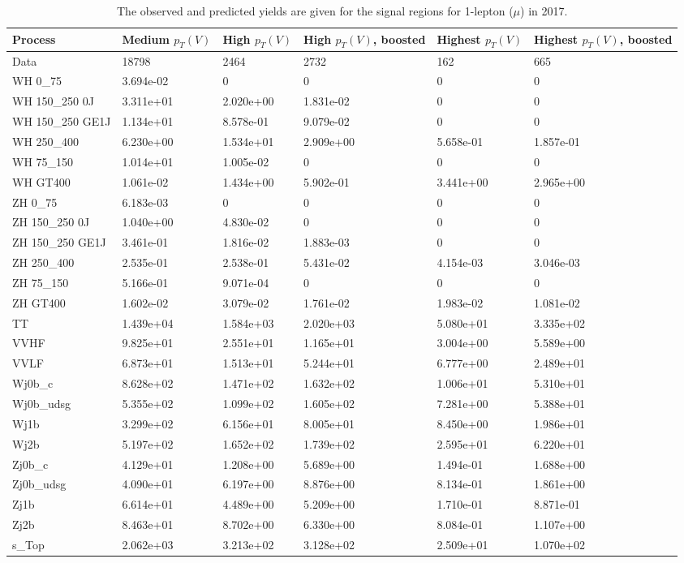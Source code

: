 \begin{table}
\centering
\caption[2017 1-lepton ($\mu$) signal selection yields]{
                  The observed and predicted yields are given for the
                  signal regions for 1-lepton ($\mu$) in 2017.
                  }
{\footnotesize
\begin{tabularx}{\textwidth}{|X|X|X|X|X|X|}
\hline
Process & Medium $p_{T}(V)$ & High $p_{T}(V)$ & High $p_{T}(V)$, boosted & Highest $p_{T}(V)$ & Highest $p_{T}(V)$, boosted \\
\hline
Data & 18798 & 2464 & 2732 & 162 & 665 \\
\hline
WH 0\_75 & 3.694e-02 & 0 & 0 & 0 & 0 \\
WH 150\_250 0J & 3.311e+01 & 2.020e+00 & 1.831e-02 & 0 & 0 \\
WH 150\_250 GE1J & 1.134e+01 & 8.578e-01 & 9.079e-02 & 0 & 0 \\
WH 250\_400 & 6.230e+00 & 1.534e+01 & 2.909e+00 & 5.658e-01 & 1.857e-01 \\
WH 75\_150 & 1.014e+01 & 1.005e-02 & 0 & 0 & 0 \\
WH GT400 & 1.061e-02 & 1.434e+00 & 5.902e-01 & 3.441e+00 & 2.965e+00 \\
ZH 0\_75 & 6.183e-03 & 0 & 0 & 0 & 0 \\
ZH 150\_250 0J & 1.040e+00 & 4.830e-02 & 0 & 0 & 0 \\
ZH 150\_250 GE1J & 3.461e-01 & 1.816e-02 & 1.883e-03 & 0 & 0 \\
ZH 250\_400 & 2.535e-01 & 2.538e-01 & 5.431e-02 & 4.154e-03 & 3.046e-03 \\
ZH 75\_150 & 5.166e-01 & 9.071e-04 & 0 & 0 & 0 \\
ZH GT400 & 1.602e-02 & 3.079e-02 & 1.761e-02 & 1.983e-02 & 1.081e-02 \\
\hline
TT & 1.439e+04 & 1.584e+03 & 2.020e+03 & 5.080e+01 & 3.335e+02 \\
VVHF & 9.825e+01 & 2.551e+01 & 1.165e+01 & 3.004e+00 & 5.589e+00 \\
VVLF & 6.873e+01 & 1.513e+01 & 5.244e+01 & 6.777e+00 & 2.489e+01 \\
Wj0b\_c & 8.628e+02 & 1.471e+02 & 1.632e+02 & 1.006e+01 & 5.310e+01 \\
Wj0b\_udsg & 5.355e+02 & 1.099e+02 & 1.605e+02 & 7.281e+00 & 5.388e+01 \\
Wj1b & 3.299e+02 & 6.156e+01 & 8.005e+01 & 8.450e+00 & 1.986e+01 \\
Wj2b & 5.197e+02 & 1.652e+02 & 1.739e+02 & 2.595e+01 & 6.220e+01 \\
Zj0b\_c & 4.129e+01 & 1.208e+00 & 5.689e+00 & 1.494e-01 & 1.688e+00 \\
Zj0b\_udsg & 4.090e+01 & 6.197e+00 & 8.876e+00 & 8.134e-01 & 1.861e+00 \\
Zj1b & 6.614e+01 & 4.489e+00 & 5.209e+00 & 1.710e-01 & 8.871e-01 \\
Zj2b & 8.463e+01 & 8.702e+00 & 6.330e+00 & 8.084e-01 & 1.107e+00 \\
s\_Top & 2.062e+03 & 3.213e+02 & 3.128e+02 & 2.509e+01 & 1.070e+02 \\
\hline
\end{tabularx}
}
\label{tab:sr-Wmn-2017}
\end{table}

